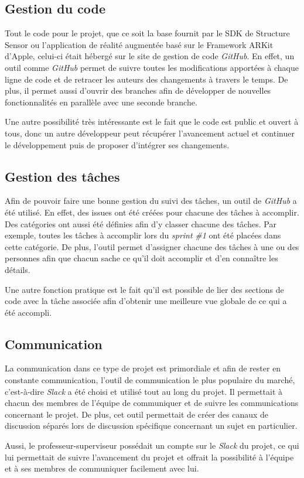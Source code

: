 \documentclass[rapport.tex]{subfiles}
\begin{document}
\subsection*{Gestion du code}
Tout le code pour le projet, que ce soit la base fournit par le SDK de Structure Sensor ou l’application de réalité augmentée basé sur le Framework ARKit d’Apple, celui-ci était hébergé sur le site de gestion de code \textit{GitHub}. En effet, un outil comme \textit{GitHub} permet de suivre toutes les modifications apportées à chaque ligne de code et de retracer les auteurs des changements à travers le temps. De plus, il permet aussi d’ouvrir des branches afin de développer de nouvelles fonctionnalités en parallèle avec une seconde branche.
\par
Une autre possibilité très intéressante est le fait que le code est public et ouvert à tous, donc un autre développeur peut récupérer l’avancement actuel et continuer le développement puis de proposer d’intégrer ses changements.
\subsection*{Gestion des tâches}
Afin de pouvoir faire une bonne gestion du suivi des tâches, un outil de \textit{GitHub} a été utilisé. En effet, des issues ont été créées pour chacune des tâches à accomplir. Des catégories ont aussi été définies afin d’y classer chacune des tâches. Par exemple, toutes les tâches à accomplir lors du \textit{sprint} \textit{\#1} ont été placées dans cette catégorie. De plus, l’outil permet d’assigner chacune des tâches à une ou des personnes afin que chacun sache ce qu’il doit accomplir et d’en connaître les détails. 
\par
Une autre fonction pratique est le fait qu’il est possible de lier des sections de code avec la tâche associée afin d’obtenir une meilleure vue globale de ce qui a été accompli.
\subsection*{Communication}
La communication dans ce type de projet est primordiale et afin de rester en constante communication, l’outil de communication le plus populaire du marché, c’est-à-dire \textit{Slack} a été choisi et utilisé tout au long du projet. Il permettait à chacun des membres de l’équipe de communiquer et de suivre les communications concernant le projet. De plus, cet outil permettait de créer des canaux de discussion séparés lors de discussion spécifique concernant un sujet en particulier.
\par
Aussi, le professeur-superviseur possédait un compte sur le \textit{Slack} du projet, ce qui lui permettait de suivre l’avancement du projet et offrait la possibilité à l’équipe et à ses membres de communiquer facilement avec lui.
\end{document}
